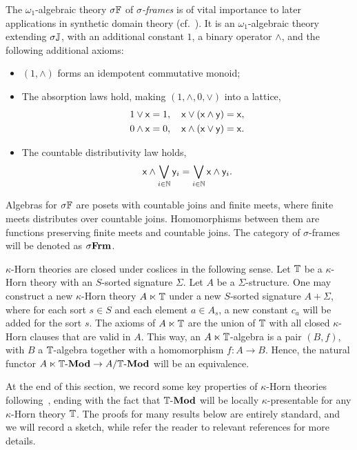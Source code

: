 \begin{example}\label{exa:theoryofsigmaframe}
  The $\omega_1$-algebraic theory $\sigma\mathbb{F}$ of \emph{$\sigma$-frames} is of vital importance to later applications in synthetic domain theory (cf.~). It is an $\omega_1$-algebraic theory extending $\sigma\mathbb{J}$, with an additional constant $1$, a binary operator $\wedge$, and the following additional axioms:
  \begin{itemize}
    \item $(1,\wedge)$ forms an idempotent commutative monoid;
    \item The absorption laws hold, making $(1,\wedge,0,\vee)$ into a lattice,
    \begin{align*}
      &1 \vee \mathsf{x} = 1, \quad \mathsf{x} \vee (\mathsf{x} \wedge \mathsf{y}) = \mathsf{x}, \\
      &0 \wedge \mathsf{x} = 0, \quad \mathsf{x} \wedge (\mathsf{x} \vee \mathsf{y}) = \mathsf{x}.
    \end{align*}
    \item The countable distributivity law holds,
    \[ \mathsf{x} \wedge \bigvee_{i\in\mathbb{N}}\mathsf{y}_i = \bigvee_{i\in\mathbb{N}}\mathsf{x} \wedge \mathsf{y}_i. \]
  \end{itemize}
  Algebras for $\sigma\mathbb{F}$ are posets with countable joins and finite meets, where finite meets distributes over countable joins. Homomorphisms between them are functions preserving finite meets and countable joins. The category of $\sigma$-frames will be denoted as $\sigma\mathbf{Frm}$.
\end{example}

\begin{example}\label{exm:coslicehorn}
  $\kappa$-Horn theories are closed under coslices in the following sense. Let $\mathbb{T}$ be a $\kappa$-Horn theory with an $S$-sorted signature $\Sigma$. Let $A$ be a $\Sigma$-structure. One may construct a new $\kappa$-Horn theory $A \ltimes \mathbb{T}$ under a new $S$-sorted signature $A+\Sigma$, where for each sort $s\in S$ and each element $a\in A_s$, a new constant $c_a$ will be added for the sort $s$. The axioms of $A \ltimes \mathbb{T}$ are the union of $\mathbb{T}$ with all closed $\kappa$-Horn clauses that are valid in $A$. This way, an $A \ltimes \mathbb{T}$-algebra is a pair $(B,f)$, with $B$ a $\mathbb{T}$-algebra together with a homomorphism $f \colon A \to B$. Hence, the natural functor $A\ltimes\mathbb{T}\text{-}\mathbf{Mod} \to A/\mathbb{T}\text{-}\mathbf{Mod}$ will be an equivalence.
\end{example}

At the end of this section, we record some key properties of $\kappa$-Horn theories following~\citet[\S3.C]{adamek1994locally}, ending with the fact that $\mathbb{T}\text{-}\mathbf{Mod}$ will be locally $\kappa$-presentable for any $\kappa$-Horn theory $\mathbb{T}$. The proofs for many results below are entirely standard, and we will record a sketch, while refer the reader to relevant references for more details. 

